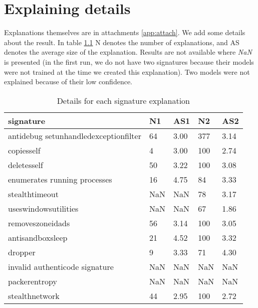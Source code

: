 \chapter{Explaining details} \label{app:expl}
Explanations themselves are in attachments \ref{app:attach}. We add some details about the result. In table \ref{tab:expdet} N denotes the number of explanations, and AS denotes the average size of the explanation. Results are not available where \emph{NaN} is presented (in the first run, we do not have two signatures because their models were not trained at the time we created this explanation). Two models were not explained because of their low confidence.

\begin{table}[h]
    \centering
    \caption{Details for each signature explanation}
    \begin{tabular}{lllll}
      \toprule
      \textbf{signature} &
      \textbf{N1} &
      \textbf{AS1} &
      \textbf{N2} &
      \textbf{AS2}
      \\
      \midrule
      antidebug setunhandledexceptionfilter & 64 & 3.00 & 377 & 3.14  \\
      \midrule
      copiesself & 4 & 3.00 & 100 & 2.74 \\
      \midrule
      deletesself & 50 & 3.22 & 100 & 3.08 \\
      \midrule
      enumerates running processes & 16 & 4.75 & 84 & 3.33 \\
      \midrule
      stealthtimeout & NaN & NaN & 78 &  3.17 \\
      \midrule
      useswindowsutilities & NaN & NaN & 67 &  1.86 \\
      \midrule
      removeszoneidads & 56 & 3.14 & 100 & 3.05 \\
      \midrule
      antisandboxsleep & 21 & 4.52 & 100 & 3.32 \\
      \midrule
      dropper & 9 & 3.33 & 71 & 4.30 \\
      \midrule
      invalid authenticode signature &  NaN &  NaN &  NaN &  NaN \\
      \midrule
      packerentropy & NaN &  NaN &  NaN &  NaN \\
      \midrule
      stealthnetwork & 44 & 2.95 & 100 & 2.72 \\
      \bottomrule
    \end{tabular}
    \label{tab:expdet}
  \end{table}